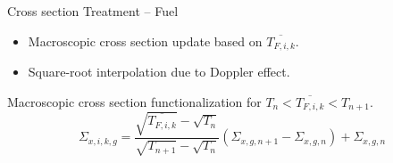 \begin{frame}{Cross section Treatment -- Fuel}
  \begin{itemize}
    \item Macroscopic cross section update based on $\overline{T_{F,i,k}}$.
    \item Square-root interpolation due to Doppler effect.
  \end{itemize}

  Macroscopic cross section functionalization for ${T_n < \overline{T_{F,i,k}} <
  T_{n+1}}$.
  \begin{equation}
    \Sigma_{x,i,k,g} = 
      \frac{\sqrt{\overline{T_{F,i,k}}} - \sqrt{T_{n}}}
      {\sqrt{T_{n+1}}-\sqrt{T_{n}}}
      (\Sigma_{x,g,n+1} - \Sigma_{x,g,n})  + \Sigma_{x,g,n}
  \end{equation}
\end{frame}
